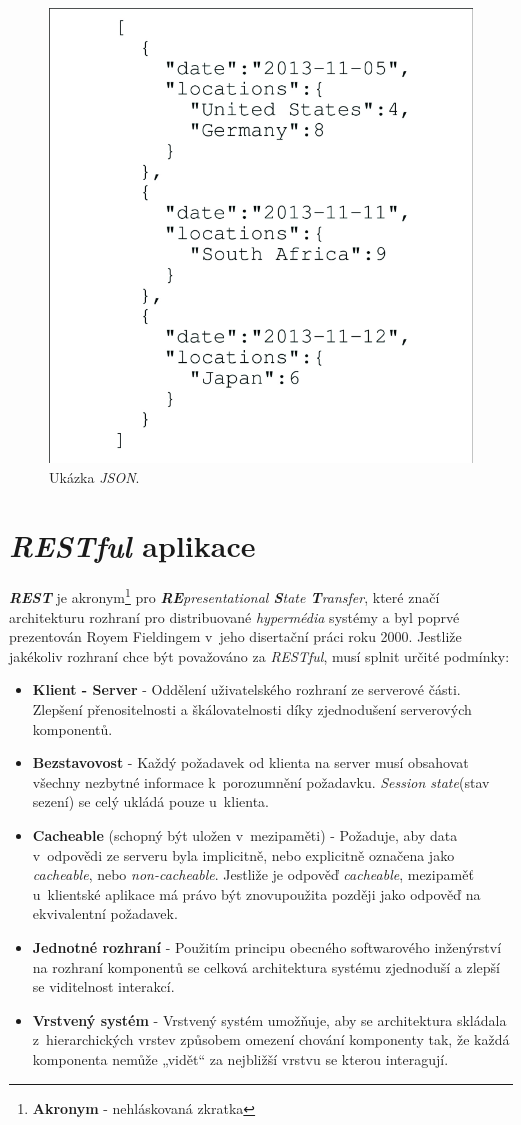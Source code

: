 \begin{figure}[hbt]
  \centering
  \includegraphics[width=.45 \linewidth]{obrazky-figures/json_example.png}
  \caption{Ukázka \emph{JSON}.~\cite{json:example}}
  \label{figure:json}
\end{figure}

\newpage
\section{\emph{RESTful} aplikace}
\label{terminy:restful}
\textbf{\emph{REST}} je akronym\footnote{\textbf{Akronym} - nehláskovaná zkratka} pro \emph{\textbf{RE}presentational \textbf{S}tate \textbf{T}ransfer},
které značí architekturu rozhraní pro distribuované \emph{hypermédia} systémy a byl poprvé prezentován Royem Fieldingem v~jeho disertační práci roku 2000.
\newline
\newline
Jestliže jakékoliv rozhraní chce být považováno za \emph{RESTful}, musí splnit určité podmínky:
\begin{itemize}
  \item \textbf{Klient - Server} - Oddělení uživatelského rozhraní ze serverové části.
        Zlepšení přenositelnosti a škálovatelnosti díky zjednodušení serverových komponentů.
  \item \textbf{Bezstavovost} - Každý požadavek od klienta na server musí obsahovat všechny nezbytné informace k~porozumnění požadavku.
        \emph{Session state}(stav sezení) se celý ukládá pouze u~klienta.
  \item \textbf{Cacheable} (schopný být uložen v~mezipaměti) - Požaduje, aby data v~odpovědi ze serveru byla implicitně, nebo explicitně označena jako \emph{cacheable}, nebo \emph{non-cacheable}.
        Jestliže je odpověď \emph{cacheable}, mezipaměť u~klientské aplikace má právo být znovupoužita později jako odpověď na ekvivalentní požadavek.
  \item \textbf{Jednotné rozhraní} - Použitím principu obecného softwarového inženýrství na rozhraní komponentů se celková architektura systému zjednoduší a zlepší se viditelnost interakcí.
  \item \textbf{Vrstvený systém} - Vrstvený systém umožňuje, aby se architektura skládala z~hierarchických vrstev způsobem omezení chování komponenty tak, že každá komponenta nemůže „vidět“ za nejbližší vrstvu se kterou interagují.
\end{itemize}


